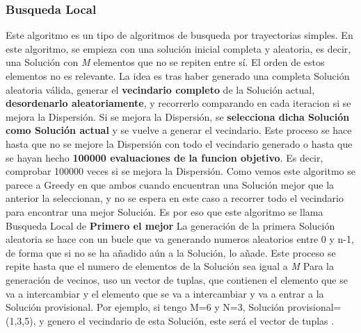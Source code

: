 \documentclass{article}
\begin{document}
\subsubsection{\scriptsize Busqueda Local}
Este algoritmo es un tipo de algoritmos de busqueda por trayectorias simples.
\newline En este algoritmo, se empieza con una solución inicial completa y aleatoria,
es decir, una Solución con \emph{M} elementos que no se repiten entre sí.
El orden de estos elementos no es relevante.
\vspace{5mm}
\newline La idea es tras haber generado una completa Solución aleatoria válida, generar el
\textbf{vecindario completo} de la Solución actual, \textbf{desordenarlo aleatoriamente}, y recorrerlo
comparando en cada iteracion si se mejora la Dispersión.
\newline Si se mejora la Dispersión, se \textbf{selecciona dicha Solución como Solución actual} y
se vuelve a generar el vecindario. Este proceso se hace hasta que no se mejore la Dispersión con
todo el vecindario generado o hasta que se hayan hecho \textbf{100000 evaluaciones de la funcion objetivo}.
Es decir, comprobar 100000 veces si se mejora la Dispersión.
\newline Como vemos este algoritmo se parece a Greedy en que ambos cuando encuentran una Solución
mejor que la anterior la seleccionan, y no se espera en este caso a recorrer todo el vecindario para
encontrar una mejor Solución. Es por eso que este algoritmo se llama Busqueda Local de \textbf{Primero el mejor}
\vspace{5mm}
\newline La generación de la primera Solución aleatoria se hace con un bucle que va generando
numeros aleatorios entre 0 y n-1, de forma que si no se ha añadido aún a la Solución, lo añade.
Este proceso se repite hasta que el numero de elementos de la Solución sea igual a \emph{M}
\newline Para la generación de vecinos, uso un vector de tuplas, que contienen el elemento que se
va a intercambiar y el elemento que se va a intercambiar y va a entrar a la Solución provisional.
\newline Por ejemplo, si tengo {M}=6 y {N}=3, Solución provisional=(1,3,5), y genero el vecindario de esta Solución,
este será el vector de tuplas .
\end{document}
